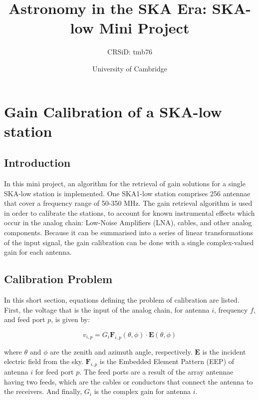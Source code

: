 \documentclass[12pt]{report} %
\title{Astronomy in the SKA Era: SKA-low Mini Project}
\author{CRSiD: tmb76}
\date{University of Cambridge}
\begin{document}
\maketitle

\tableofcontents

\chapter*{Gain Calibration of a SKA-low station}

\section{Introduction}

In this mini project, an algorithm for the retrieval of gain solutions for a single SKA-low station is implemented. One SKA1-low station comprises 256 antennae that cover a frequency range of 50-350 MHz. The gain retrieval algorithm is used in order to calibrate the stations, to account for known instrumental effects which occur in the analog chain: Low-Noise Amplifiers (LNA), cables, and other analog components\cite{borg2020on-sky}. Because it can be summarised into a series of linear transformations of the input signal, the gain calibration can be done with a single complex-valued gain for each antenna.

\section{Calibration Problem}

In this short section, equations defining the problem of calibration are listed. First, the voltage that is the input of the analog chain, for antenna $i$, frequency $f$, and feed port $p$, is given by:

\begin{equation}
    v_{i, p} = G_{i} \mathbf{F}_{i,p}(\theta, \phi) \cdot \mathbf{E}(\theta, \phi)
\end{equation}

where $\theta$ and $\phi$ are the zenith and azimuth angle, respectively. $\mathbf{E}$ is the incident electric field from the sky. $\mathbf{F}_{i,p}$ is the Embedded Element Pattern (EEP) of antenna $i$ for feed port $p$. The feed ports are a result of the array antennae having two feeds, which are the cables or conductors that connect the antenna to the receivers\cite{smirnov2011revisiting}\cite{antenna_feed}. And finally, $G_{i}$ is the complex gain for antenna $i$.
\end{document}

